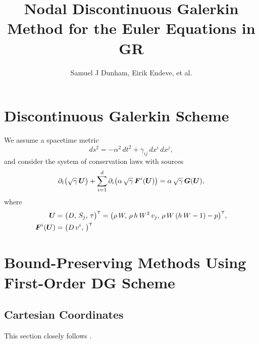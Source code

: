 \documentclass[10pt,preprint]{aastex}
\begin{document}
\title{Nodal Discontinuous Galerkin Method for the Euler Equations in GR}
\author{Samuel J Dunham, Eirik Endeve, et al.}

\tableofcontents

\section{Discontinuous Galerkin Scheme}
\label{sec:dgMethod}

We assume a spacetime metric
\begin{equation}
  ds^{2}=-\alpha^{2}\,dt^{2}+\gamma_{ij}\,dx^{i}\,dx^{j},
\end{equation}
and consider the system of conservation laws with sources
\begin{equation}
  \partial_{t}{}\big(\sqrt{\gamma}\,\boldsymbol{U}\big)+\sum_{i=1}^{d}\partial_{i}{}\big(\alpha\,\sqrt{\gamma}\,\boldsymbol{F}^{i}(\boldsymbol{U})\big)=\alpha\,\sqrt{\gamma}\,\boldsymbol{G}(\boldsymbol{U}),
  \label{eq:conservationLaws}
\end{equation}
where
\begin{align}
  \boldsymbol{U}
  &=\big(D,\,S_{j},\,\tau\big)^{\mbox{\tiny T}}
  =\big(\rho\,W,\,\rho\,h\,W^{2}\,v_{j},\,\rho\,W\left(h\,W-1\right)-p\big)^{\mbox{\tiny T}}, \\
  \boldsymbol{F}^{i}(\boldsymbol{U})
  &=\big(D\,v^{i},\,\big)^{\mbox{\tiny T}}
\end{align}


\section{Bound-Preserving Methods Using First-Order DG Scheme}

\subsection{Cartesian Coordinates}
This section closely follows \citet{Qin2016}.
\end{document}
